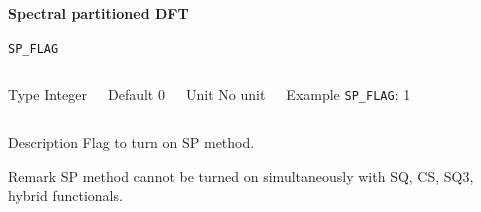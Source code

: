 
\begin{frame}[allowframebreaks,c]{} \label{SP}

\begin{center}
\Huge \textbf{Spectral partitioned DFT}
\end{center}

\end{frame}

\begin{frame}[allowframebreaks]{\texttt{SP\_FLAG}} \label{SP_FLAG}
\vspace*{-12pt}
\begin{columns}
\begin{block}{Type}
Integer
\end{block}

\begin{block}{Default}
0
\end{block}

\begin{block}{Unit}
No unit
\end{block}

\begin{block}{Example}
\texttt{SP\_FLAG}: 1
\end{block}
\end{columns}

\begin{block}{Description}
Flag to turn on SP method.
\end{block}

\begin{block}{Remark}
SP method cannot be turned on simultaneously with SQ, CS, SQ3, hybrid functionals. 
\end{block}

\end{frame}

